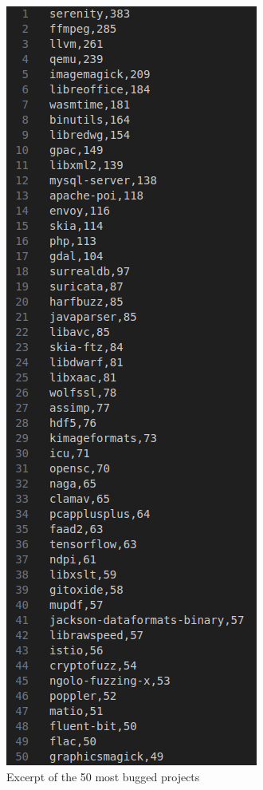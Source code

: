 \begin{figure}[h]
\centering
\includegraphics[scale=0.44]{foto/list.png}
\caption{Excerpt of the 50 most bugged projects}
\label{fig:list}
\end{figure}

